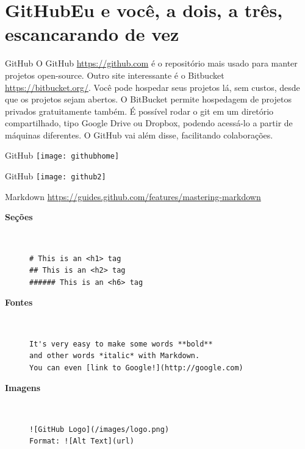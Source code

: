 \section{GitHub\break Eu e você, a dois, a três, escancarando de vez }

\begin{frame}{GitHub}
	\vfill
	O GitHub \url{https://github.com} é o repositório mais usado para manter projetos open-source. Outro site interessante é o Bitbucket \url{https://bitbucket.org/}. Você pode hospedar seus projetos lá, sem custos, desde que os projetos sejam abertos. O BitBucket permite hospedagem de projetos privados gratuitamente também. 
	\vfill
	É possível rodar o git em um diretório compartilhado, tipo Google Drive ou Dropbox, podendo acessá-lo a partir de máquinas diferentes. O GitHub vai além disse, facilitando colaborações.
	\vfill
\end{frame}

\begin{frame}{GitHub}
	\nocanto
	\texttt{[image: githubhome]}
\end{frame}

\begin{frame}{GitHub}
	\vspace{-0.12cm}\hspace*{-0.9cm}
	\texttt{[image: github2]}
\end{frame}

\begin{frame}[fragile]{Markdown}
	\url{https://guides.github.com/features/mastering-markdown}
	
\begin{description}
\item[\bf Seções] \hfill\\
\begin{Verbatim}
# This is an <h1> tag
## This is an <h2> tag
###### This is an <h6> tag
\end{Verbatim}
\item[\bf Fontes] \hfill \\
\begin{Verbatim}
It's very easy to make some words **bold** 
and other words *italic* with Markdown. 
You can even [link to Google!](http://google.com)
\end{Verbatim}
\item[\bf Imagens] \hfill \\
\begin{Verbatim}
![GitHub Logo](/images/logo.png)
Format: ![Alt Text](url)
\end{Verbatim}
\end{description}
\end{frame}
%


